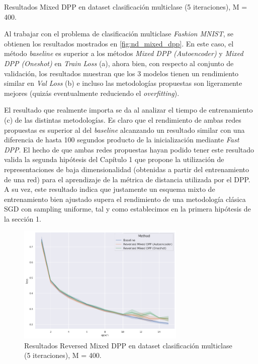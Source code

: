 \begin{images}[\label{fig:nd_mixed_dpp}]{\centering Resultados Mixed DPP en dataset clasificación multiclase (5 iteraciones), M = 400.}

\end{images}

Al trabajar con el problema de clasificación multiclase \textit{Fashion MNIST}, se obtienen los resultados mostrados en \ref{fig:nd_mixed_dpp}. En este caso, el método \textit{baseline} es superior a los métodos \textit{Mixed DPP (Autoencoder)} y \textit{Mixed DPP (Oneshot)} en \textit{Train Loss} (a), ahora bien, con respecto al conjunto de validación, los resultados muestran que los 3 modelos tienen un rendimiento similar en \textit{Val Loss} (b) e incluso las metodologías propuestas son ligeramente mejores (quizás eventualmente reduciendo el \textit{overfitting}).

\vspace{0.2cm}

El resultado que realmente importa se da al analizar el tiempo de entrenamiento (c) de las distintas metodologías. Es claro que el rendimiento de ambas redes propuestas es superior al del \textit{baseline} alcanzando un resultado similar con una diferencia de hasta 100 segundos producto de la inicialización mediante \textit{Fast DPP}. El hecho de que ambas redes propuestas hayan podido tener este resultado valida la segunda hipótesis del Capítulo 1 que propone la utilización de representaciones de baja dimensionalidad (obtenidas a partir del entrenamiento de una red) para el aprendizaje de la métrica de distancia utilizada por el DPP. A su vez, este resultado indica que justamente un esquema mixto de entrenamiento bien ajustado supera el rendimiento de una metodología clásica SGD con sampling uniforme, tal y como establecimos en la primera hipótesis de la sección 1. 

\vspace{0.2cm}

\begin{figure}[ht]
    \centering
    \includegraphics[width=8cm]{img/tesis/resultados/loss_nd_reversed_mixed.jpg}
    \caption{Resultados Reversed Mixed DPP en dataset clasificación multiclase (5 iteraciones), M = 400.}
    \label{fig:nd_reversed_mixed_dpp}
\end{figure}

